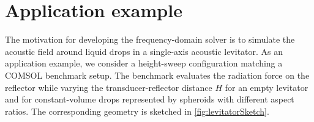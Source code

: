 \documentclass[final,num,12pt]{elsarticle}
\begin{document}
\FloatBarrier
\section{Application example}
\label{sec:application}

The motivation for developing the frequency-domain solver is to simulate the acoustic field around liquid drops in a single-axis acoustic levitator.  As an application example, we consider a height-sweep configuration matching a COMSOL benchmark setup.  The benchmark evaluates the radiation force on the reflector while varying the transducer-reflector distance $H$ for an empty levitator and for constant-volume drops represented by spheroids with different aspect ratios.  The corresponding geometry is sketched in \cref{fig:levitatorSketch}.

\begin{figure}[H]
    \centering
\end{figure}
\end{document}
